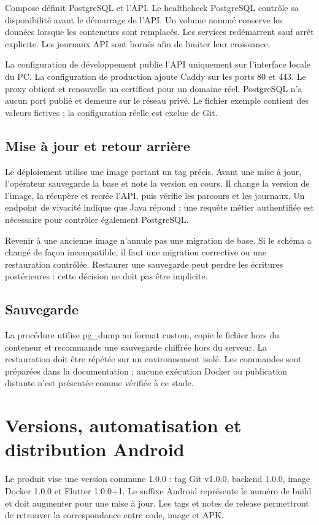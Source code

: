 \documentclass[11pt,a4paper]{article}
\begin{document}
Compose définit PostgreSQL et l'API. Le healthcheck PostgreSQL contrôle sa disponibilité avant le démarrage de l'API. Un volume nommé conserve les données lorsque les conteneurs sont remplacés. Les services redémarrent sauf arrêt explicite. Les journaux API sont bornés afin de limiter leur croissance.

La configuration de développement publie l'API uniquement sur l'interface locale du PC. La configuration de production ajoute Caddy sur les ports 80 et 443. Le proxy obtient et renouvelle un certificat pour un domaine réel. PostgreSQL n'a aucun port publié et demeure sur le réseau privé. Le fichier exemple contient des valeurs fictives ; la configuration réelle est exclue de Git.

\subsection*{Mise à jour et retour arrière}
Le déploiement utilise une image portant un tag précis. Avant une mise à jour, l'opérateur sauvegarde la base et note la version en cours. Il change la version de l'image, la récupère et recrée l'API, puis vérifie les parcours et les journaux. Un endpoint de vivacité indique que Java répond ; une requête métier authentifiée est nécessaire pour contrôler également PostgreSQL.

Revenir à une ancienne image n'annule pas une migration de base. Si le schéma a changé de façon incompatible, il faut une migration corrective ou une restauration contrôlée. Restaurer une sauvegarde peut perdre les écritures postérieures : cette décision ne doit pas être implicite.

\subsection*{Sauvegarde}
La procédure utilise pg\_dump au format custom, copie le fichier hors du conteneur et recommande une sauvegarde chiffrée hors du serveur. La restauration doit être répétée sur un environnement isolé. Les commandes sont préparées dans la documentation ; aucune exécution Docker ou publication distante n'est présentée comme vérifiée à ce stade.
\newpage
\section{Versions, automatisation et distribution Android}
Le produit vise une version commune 1.0.0 : tag Git v1.0.0, backend 1.0.0, image Docker 1.0.0 et Flutter 1.0.0+1. Le suffixe Android représente le numéro de build et doit augmenter pour une mise à jour. Les tags et notes de release permettront de retrouver la correspondance entre code, image et APK.
\end{document}
